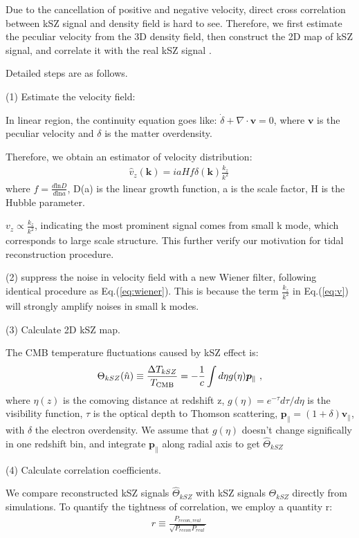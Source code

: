 Due to the cancellation of positive and negative velocity, direct cross correlation between kSZ signal and density field is hard to see.
Therefore, we first estimate the peculiar velocity from the 3D density field, 
then construct the 2D map of kSZ signal, 
and correlate it with the real kSZ signal \cite{Shao11}.

Detailed steps are as follows.

(1) Estimate the velocity field:

In linear region, the continuity equation goes like:
$\dot \delta+\nabla \cdot \bm{v}=0$, 
where $\bm{v}$ is the peculiar velocity and $\delta$ is the matter overdensity. 

Therefore, we obtain an estimator of velocity distribution:
\begin{eqnarray}
	\label{eq:v}
\hat v_z(\bm{k})=i a H f\delta(\bm{k})\frac{k_z}{k^2}\,
\end{eqnarray}
where $f=\frac{d\mathrm{ln}D}{d\mathrm{ln}a}$, D(a) is the linear growth function, 
a is the scale factor, H is the Hubble parameter.

$v_z \propto \frac{k_z}{k^2}$, indicating the most prominent signal comes from small k mode, which corresponds to large scale structure. 
This further verify our motivation for tidal reconstruction procedure.

(2) suppress the noise in velocity field with a new Wiener filter, following identical procedure as Eq.(\ref{eq:wiener}). This is because the term $\frac{k_z}{k^2}$ in Eq.(\ref{eq:v}) will strongly amplify noises in small k modes. 

(3) Calculate 2D kSZ map.

The CMB temperature fluctuations caused by kSZ effect is:
\begin{eqnarray}
\label{eq:ksz}
\Theta_{kSZ}(\hat n)\equiv\frac{\Delta T_{kSZ}}{T_{\mathrm{CMB}}}
=-\frac{1}{c}\int d\eta  g(\eta)  \bm{p}_\parallel\ ,
\end{eqnarray}
where $\eta(z)$ is the comoving distance at redshift z, $g(\eta)=e^{-\tau} d\tau/d\eta$ is the visibility function, $\tau$ is the optical depth to Thomson scattering, $\bm{p}_\parallel=(1+\delta)\bm{v}_\parallel$, with $\delta$ the electron overdensity. 
We assume that $g(\eta)$ doesn't change significally in one redshift bin, 
and integrate $\bm{p}_\parallel$ along radial axis to get $\hat \Theta_{kSZ}$

(4) Calculate correlation coefficients.

We compare reconstructed kSZ signals $\hat \Theta_{kSZ}$ with kSZ signals $\Theta_{kSZ}$ directly from simulations. 
To quantify the tightness of correlation, we employ a quantity r: 
\begin{eqnarray}
	r\equiv \frac{P_{recon,real}}{\sqrt{P_{recon}P_{real}}}\,
\end{eqnarray}


